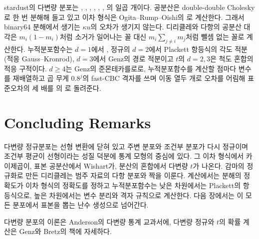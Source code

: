 \begin{instardust}
stardust의 다변량 분포는 , , , , , , 의 일곱 개이다. 공분산은 double-double Cholesky로 한 번 분해해 들고 있고 이차 형식은 Ogita--Rump--Oishi의 \cite{ogita2005accurate}로 계산한다. 그래서 binary64 분해에서 생기는 $\kappa u$의 오차가 생기지 않는다. 디리클레와 다항의 공분산 대각은 $m_i(1-m_i)$처럼 소거가 일어나는 꼴 대신 $m_i\sum_{j\ne i}m_j$처럼 뺄셈 없는 꼴로 계산한다. 누적분포함수는 $d=1$에서 , 정규의 $d=2$에서 Plackett 항등식의 각도 적분(적응 Gauss--Kronrod), $d=3$에서 Genz의 경로 적분이고 $t$의 $d=2,3$은 척도 혼합의 적응 구적이다. $d\ge4$는 Genz의 준몬테카를로로, 누적분포함수를 계산할 점마다 변수를 재배열하고 곱 무게 $0.8^j$의 fast-CBC 격자를 쓰며 이동 열두 개로 오차를 어림해 표준오차의 세 배를 의 로 돌려준다.
\end{instardust}

\section{Concluding Remarks}

다변량 정규분포는 선형 변환에 닫혀 있고 주변 분포와 조건부 분포가 다시 정규이며 조건부 평균이 선형이라는 성질 덕분에 통계 모형의 중심에 있다. 그 이차 형식에서 카이제곱이, 표본 공분산에서 Wishart가, 분산의 혼합에서 다변량 $t$가 나온다. 감마의 정규화로 만든 디리클레는 범주 자료의 다항 분포와 짝을 이룬다. 계산에서는 분해의 정확도가 이차 형식의 정확도를 정하고 누적분포함수는 낮은 차원에서는 Plackett의 항등식으로, 높은 차원에서는 변수 분리와 격자 규칙으로 계산한다. 다음 장에서는 이 모든 분포에서 표본을 뽑는 난수 생성으로 넘어간다.

다변량 분포의 이론은 Anderson의 다변량 통계 교과서\cite{anderson2003}에, 다변량 정규와 $t$의 확률 계산은 Genz와 Bretz의 책\cite{genz2009}에 자세하다.

\chapterreferences
